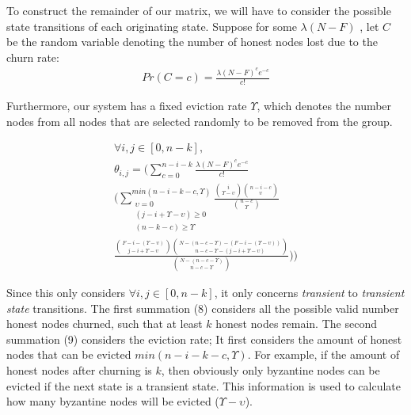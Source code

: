 To construct the remainder of our matrix, we will have to consider the possible state transitions of each originating state. Suppose for some $\lambda(N-F)$ , let $C$ be the random variable denoting the number of honest nodes lost due to the churn rate:
\begin{gather}
    Pr(C=c) = \frac{\lambda(N-F)^c e^{-c}}{c!}
\end{gather}

Furthermore, our system has a fixed eviction rate $\Upsilon$, which denotes the number nodes from all nodes that are selected randomly to be removed from the group. 

\begin{gather}
    \forall i,j \in [0, n-k],\\
    \theta_{i,j} = 
    \Biggl( 
    \sum_{c=0}^{n-i-k} 
    \frac{\lambda(N-F)^c e^{-c}}{c!} \\
    \Biggl( 
    \sum_{\substack{\upsilon=0\\(j-i+\Upsilon-\upsilon) \geq 0\\(n-k-c)\geq \Upsilon} }^{min(n-i-k-c,\Upsilon)} 
    \frac{\binom{i}{\Upsilon-\upsilon}\binom{n-i-c}{\upsilon}}{\binom{n-c}{\Upsilon}} \\
    \frac{\binom{F-i-(\Upsilon-\upsilon)}{j-i+\Upsilon-\upsilon}\binom{N-(n-c-\Upsilon)-(F-i-(\Upsilon-\upsilon))}{n-c-\Upsilon-(j-i+\Upsilon-\upsilon)}}{\binom{N-(n-c-\Upsilon)}{n-c-\Upsilon}}
    \Biggl)\Biggl)
\end{gather}

Since this only considers $\forall i,j \in [0, n-k]$, it only concerns \textit{transient} to \textit{transient state} transitions. The first summation (8) considers all the possible valid number honest nodes churned, such that at least $k$ honest nodes remain. 
The second summation (9) considers the eviction rate; It first considers the amount of honest nodes that can be evicted $min(n-i-k-c,\Upsilon)$. For example, if the amount of honest nodes after churning is $k$, then obviously only byzantine nodes can be evicted if the next state is a transient state. This information is used to calculate how many byzantine nodes will be evicted ($\Upsilon - \upsilon$).

